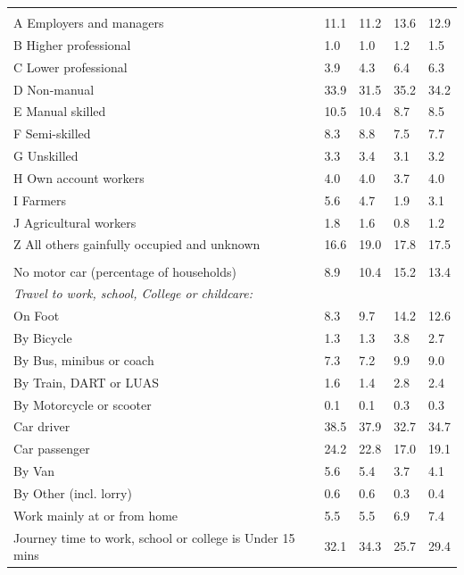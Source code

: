 \documentclass{article}
\begin{document}
\begin{table}[h]
\begin{tabular}{KTTTT}
\hline
    \\ 
    \hline
A Employers and managers & 11.1& 11.2& 13.6& 12.9\\
B Higher professional & 1.0& 1.0& 1.2& 1.5\\
C Lower professional & 3.9& 4.3& 6.4& 6.3\\
D Non-manual & 33.9& 31.5& 35.2& 34.2\\
E Manual skilled & 10.5& 10.4&  8.7&  8.5\\
F Semi-skilled & 8.3& 8.8& 7.5& 7.7\\
G Unskilled & 3.3& 3.4& 3.1& 3.2\\
H Own account workers & 4.0& 4.0& 3.7& 4.0\\
I Farmers & 5.6& 4.7& 1.9& 3.1\\
J Agricultural workers & 1.8& 1.6& 0.8& 1.2\\
Z All others gainfully occupied and unknown & 16.6& 19.0& 17.8& 17.5\\
\hline
{}\hline
    \\ 
    \hline
No motor car (percentage of households) &  8.9& 10.4& 15.2& 
13.4\\
    \hline 
\emph{Travel to work, school, College or childcare:} & & & \\
\quad On Foot &  8.3&  9.7& 14.2& 12.6\\ 
\quad By Bicycle & 1.3& 1.3& 3.8& 2.7\\ 
\quad By Bus, minibus or coach & 7.3& 7.2& 9.9& 9.0\\
\quad By Train, DART or LUAS & 1.6& 1.4& 2.8& 2.4\\
\quad By Motorcycle or scooter & 0.1& 0.1& 0.3& 0.3\\
\quad Car driver & 38.5 & 37.9& 32.7& 34.7\\
\quad Car passenger & 24.2& 22.8& 17.0& 19.1\\
\quad By Van & 5.6& 5.4& 3.7& 4.1\\
\quad By Other (incl. lorry) & 0.6& 0.6& 0.3& 0.4\\
    \hline
Work mainly at or from home & 5.5& 5.5& 6.9& 7.4\\
Journey time to work, school or college is Under 15 mins & 32.1& 34.3& 25.7& 29.4\\

\end{tabular}
\end{table}
\end{document}
